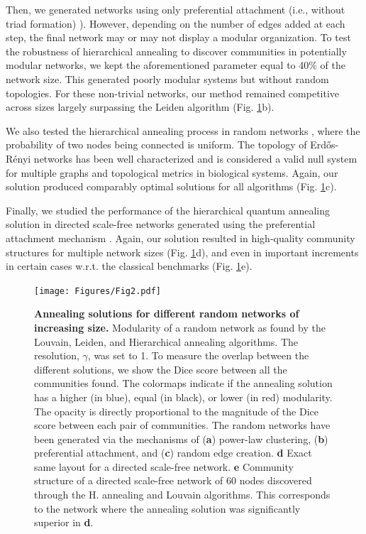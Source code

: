 \documentclass[pdflatex,sn-mathphys-num]{sn-jnl}%
\begin{document}
Then, we generated networks using only preferential attachment (i.e., without triad formation) \cite{Barabasi1999}). However, depending on the number of edges added at each step, the final network may or may not display a modular organization. To test the robustness of hierarchical annealing to discover communities in potentially modular networks, we kept the aforementioned parameter equal to 40\% of the network size. This generated poorly modular systems but without random topologies. For these non-trivial networks, our method remained competitive across sizes largely surpassing the Leiden algorithm (Fig. \ref{fig:random-nets}b).

We also tested the hierarchical annealing process in random networks \cite{erdds1959random}, where the probability of two nodes being connected is uniform. The topology of Erd\H{o}s-R\'enyi networks has been well characterized and is considered a valid null system for multiple graphs and topological metrics in biological systems. Again, our solution produced comparably optimal solutions for all algorithms (Fig. \ref{fig:random-nets}c). 

Finally, we studied the performance of the hierarchical quantum annealing solution in directed scale-free networks generated using the preferential attachment mechanism \cite{bollobas2003}. Again, our solution resulted in high-quality community structures for multiple network sizes (Fig. \ref{fig:random-nets}d), and even in important increments in certain cases w.r.t. the classical benchmarks (Fig. \ref{fig:random-nets}e).

\begin{figure}
    \centering
    \texttt{[image: Figures/Fig2.pdf]}
    \caption{\textbf{Annealing solutions for different random networks of increasing size.} Modularity of a random network as found by the Louvain, Leiden, and Hierarchical annealing algorithms. The resolution, $\gamma$, was set to 1. To measure the overlap between the different solutions, we show the Dice score between all the communities found. The colormaps indicate if the annealing solution has a higher (in blue), equal (in black), or lower (in red) modularity. The opacity is directly proportional to the magnitude of the Dice score between each pair of communities. The random networks have been generated via the mechanisms of (\textbf{a}) power-law clustering, (\textbf{b}) preferential attachment, and (\textbf{c}) random edge creation. \textbf{d} Exact same layout for a directed scale-free network. \textbf{e} Community structure of a directed scale-free network of 60 nodes discovered through the H. annealing and Louvain algorithms. This corresponds to the network where the annealing solution was significantly superior in \textbf{d}.}
    \label{fig:random-nets}
\end{figure}
\end{document}
